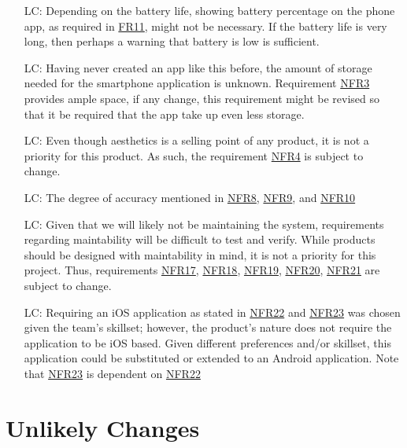 \documentclass[12pt]{article}
\newcounter{lcnum} %
\begin{document}
\begin{itemize}

\item[LC\refstepcounter{lcnum}\thelcnum\label{LC_meaningfulLabel}:]  Depending on the battery life, showing battery percentage on the phone app, as required in \hyperref[FR11]{FR11}, might not be necessary. If the battery life is very long, then perhaps a warning that battery is low is sufficient. 
\item[LC\refstepcounter{lcnum}\thelcnum\label{LC_meaningfulLabel}:] Having never created an app like this before, the amount of storage needed for the smartphone application is unknown. Requirement \hyperref[NFR3]{NFR3} provides ample space, if any change, this requirement might be revised so that it be required that the app take up even less storage. 
\item[LC\refstepcounter{lcnum}\thelcnum\label{LC_meaningfulLabel}:] Even though aesthetics is a selling point of any product, it is not a priority for this product. As such, the requirement \hyperref[NFR4]{NFR4} is subject to change. 
\item[LC\refstepcounter{lcnum}\thelcnum\label{LC_meaningfulLabel}:] The degree of accuracy mentioned in \hyperref[NFR8]{NFR8}, \hyperref[NFR9]{NFR9}, and \hyperref[NFR10]{NFR10}
\item[LC\refstepcounter{lcnum}\thelcnum\label{LC_meaningfulLabel}:] Given that we will likely not be maintaining the system, requirements regarding maintability will be difficult to test and verify. While products should be designed with maintability in mind, it is not a priority for this project. Thus, requirements \hyperref[NFR17]{NFR17}, \hyperref[NFR18]{NFR18}, \hyperref[NFR19]{NFR19}, \hyperref[NFR20]{NFR20}, \hyperref[NFR21]{NFR21} are subject to change. 
\item[LC\refstepcounter{lcnum}\thelcnum\label{LC_meaningfulLabel}:] Requiring an iOS application as stated in \hyperref[NFR22]{NFR22} and \hyperref[NFR23]{NFR23} was chosen given the team's skillset; however, the product's nature does not require the application to be iOS based. Given different preferences and/or skillset, this application could be substituted or extended to an Android application. Note that \hyperref[NFR23]{NFR23} is dependent on \hyperref[NFR22]{NFR22}

\end{itemize}

\section{Unlikely Changes}    
\end{document}
